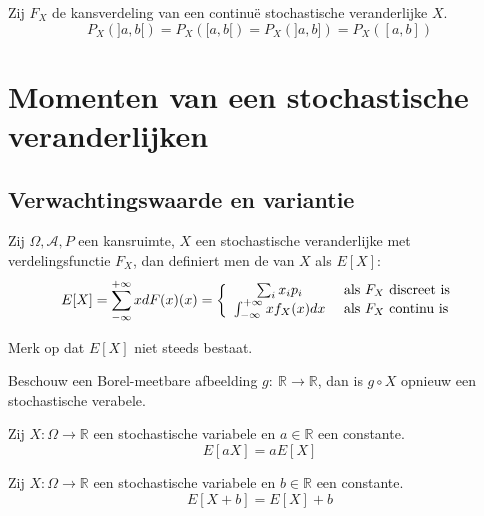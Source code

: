 \documentclass[main.tex]{subfiles}
\begin{document}
\begin{st}
  Zij $F_{X}$ de kansverdeling van een continu\"e stochastische veranderlijke $X$.
  \[ P_{X}(]a,b[) = P_{X}([a,b[) = P_{X}(]a,b]) = P_{X}([a,b]) \]
\end{st}

\section{Momenten van een stochastische veranderlijken}
\label{sec:momenten-van-een}

\subsection{Verwachtingswaarde en variantie}
\label{sec:verw-en-vari}

\begin{de}
  Zij $\Omega,\mathcal{A},P$ een kansruimte, $X$ een stochastische veranderlijke met verdelingsfunctie $F_{X}$, dan definiert men de  van $X$ als $E[X]$:
  \[
  E[X]
  = \sum_{-\infty}^{+\infty}xdF(x)(x)
  =
  \left\{
    \begin{array}{c l}
      \sum_{i}x_{i}p_{i} &\text{ als } F_{X} \text{ discreet is} \\
      \int_{-\infty}^{+\infty}xf_{X}(x)dx &\text{ als } F_{X} \text{ continu is} 
    \end{array}
  \right.
  \]
\end{de}

\begin{opm}
  Merk op dat $E[X]$ niet steeds bestaat.
\end{opm}

\begin{st}
  Beschouw een Borel-meetbare afbeelding $g:\ \mathbb{R} \rightarrow \mathbb{R}$, dan is $g \circ X$ opnieuw een stochastische verabele.
\end{st}

\begin{ei}
  Zij $X: \Omega \rightarrow \mathbb{R}$ een stochastische variabele en $a\in \mathbb{R}$ een constante.
  \[ E[aX] = aE[X] \]
\end{ei}

\begin{ei}
  Zij $X: \Omega \rightarrow \mathbb{R}$ een stochastische variabele en $b\in \mathbb{R}$ een constante.
  \[ E[X+b] = E[X] + b \]
\end{ei}
\end{document}
